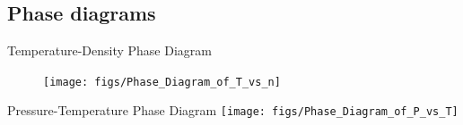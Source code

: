 \documentclass{beamer}
\begin{document}



\subsection*{Phase diagrams}
\begin{frame}{Temperature-Density Phase Diagram}
    \begin{figure}
        \centering
        \texttt{[image: figs/Phase\_Diagram\_of\_T\_vs\_n]}
        \label{fig:Phase_Diagram_of_T_vs_n}
    \end{figure}
\end{frame}

\begin{frame}{Pressure-Temperature Phase Diagram}
    \centering
    \texttt{[image: figs/Phase\_Diagram\_of\_P\_vs\_T]}\\
    \vspace{-1em}
\end{frame}





\end{document}
